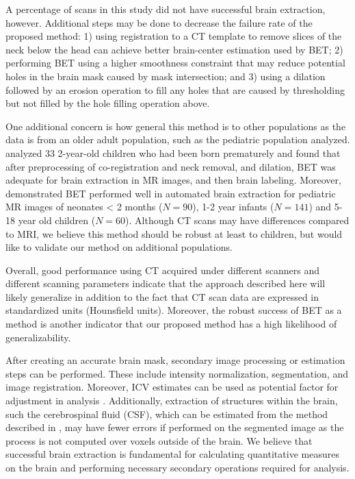 \documentclass{elsarticle}\usepackage[]{graphicx}\usepackage[]{color}
\begin{document}
A percentage of scans in this study did not have successful brain extraction, however.  Additional steps may be done to decrease the failure rate of the proposed method: 1) using registration to a CT template \citep{rorden_age-specific_2012} to remove slices of the neck below the head can achieve better brain-center estimation used by BET; 2) performing BET using a higher smoothness constraint that may reduce potential holes in the brain mask caused by mask intersection; and 3) using a dilation followed by an erosion operation to fill any holes that are caused by thresholding but not filled by the hole filling operation above.  


One additional concern is how general this method is to other populations as the data is from an older adult population, such as the pediatric population \citep{mandell2014volumetric2} analyzed.   \citet{gousias2008automatic} analyzed 33 2-year-old children who had been born prematurely and found that after preprocessing of co-registration and neck removal, and dilation, BET was adequate for brain extraction in MR images, and then brain labeling.  Moreover, \citet{shi2012label} demonstrated BET performed well in automated brain extraction for pediatric MR images of neonates < 2 months ($N = 90$), 1-2 year infants ($N = 141$) and 5-18 year old children ($N = 60$).  Although CT scans may have differences compared to MRI, we believe this method should be robust at least to children, but would like to validate our method on additional populations.  

Overall, good performance using CT acquired under different scanners and different scanning parameters indicate that the approach described here will likely generalize in addition to the fact that CT scan data are expressed in standardized units (Hounsfield units).  Moreover, the robust success of BET as a method is another indicator that our proposed method has a high likelihood of generalizability.


After creating an accurate brain mask, secondary image processing or estimation steps can be performed.  These include intensity normalization, segmentation, and image registration.  Moreover, ICV estimates can be used as potential factor for adjustment in analysis \citep{whitwell2001normalization}.  Additionally, extraction of structures within the brain, such the cerebrospinal fluid (CSF), which can be estimated from the method described in \citet{volkau2010ventricle}, may have fewer errors if performed on the segmented image as the process is not computed over voxels outside of the brain.  We believe that successful brain extraction is fundamental for calculating quantitative measures on the brain and performing necessary secondary operations required for analysis.
\end{document}

